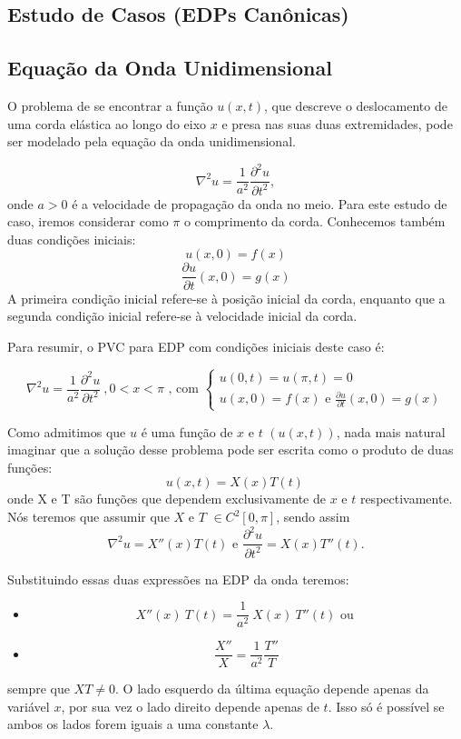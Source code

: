 \documentclass[a4paper,portuguese,9pt,final]{extarticle}
\begin{document}
\begin{multicols*}{2}
\section{Estudo de Casos (EDPs Canônicas)}

    \subsection{Equação da Onda Unidimensional}

            O problema de se encontrar a função $u(x,t)$, que descreve o deslocamento de uma corda elástica ao longo do eixo $x$ e presa nas suas duas extremidades, pode ser modelado pela equação da onda unidimensional.

            $$ \nabla^{2} u=\frac{1}{a^{2}}\frac{\partial^{2}u }{\partial t^{2}} ,$$
            onde $a>0$ é a velocidade de propagação da onda no meio. Para este estudo de caso, iremos considerar como $\pi$ o comprimento da corda. Conhecemos também duas condições iniciais:
            $$u(x,0)=f(x)$$
            $$\frac{\partial u}{\partial t}(x,0)=g(x)$$
            A primeira condição inicial refere-se à posição inicial da corda, enquanto que a segunda condição inicial refere-se à velocidade inicial da corda.

            Para resumir, o PVC para EDP com condições iniciais deste caso é:

            $$  \nabla^{2} u=\frac{1}{a^{2}}\frac{\partial^{2}u }{\partial t^{2}} \ , 0<x<\pi \mbox{ , com } \begin{cases}
            u(0,t)=u(\pi,t)=0\\
            u(x,0)=f(x) \mbox{ e } \frac{\partial u}{\partial t}(x,0)=g(x)
            \end{cases}    $$

            Como admitimos que $u$ é uma função de $x$ e $t$ $(u(x,t))$, nada mais natural imaginar que a solução desse problema pode ser escrita como o produto de duas funções:
            $$ u(x,t)=X(x)T(t) \,$$
            onde X e T são funções que dependem exclusivamente de $x$ e $t$ respectivamente. Nós teremos que assumir que $X$ e $T$ $\in C^{2}[0,\pi]$, sendo assim
            $$  \nabla^{2}u=X''(x)T(t)  \mbox{ \ e \ }   \frac{\partial^{2}u }{\partial t^{2}} = X(x)T''(t).$$

            Substituindo essas duas expressões na EDP da onda teremos:
            \begin{itemize}
                \item[]$$ X''(x)\ T(t)=\frac{1}{a^{2}}\ X(x)\ T''(t) \mbox{\ \ ou \ }$$
                \item[] $$\frac{X''}{X} = \frac{1}{a^{2}}\frac{T''}{T} $$
            \end{itemize}
            sempre que $XT\neq 0$. O lado esquerdo da última equação depende apenas da variável $x$, por sua vez o lado direito depende apenas de $t$. Isso só é possível se ambos os lados forem iguais a uma constante $\lambda$.


\end{multicols*}
\end{document}
